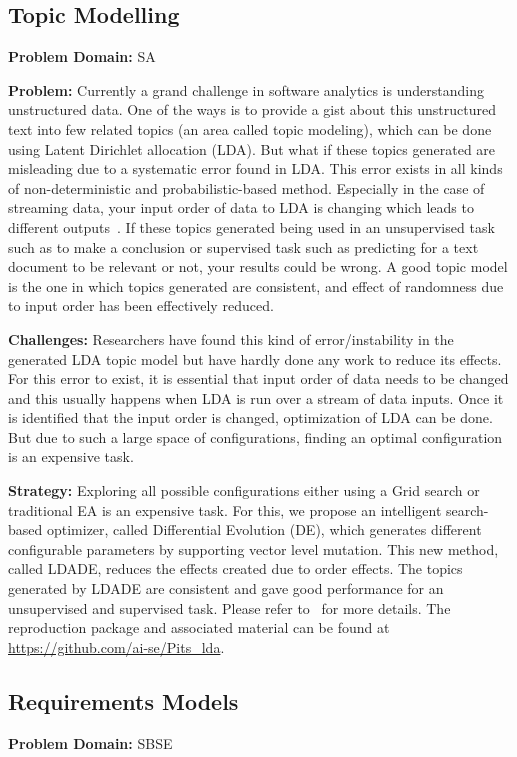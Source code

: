 \documentclass[table, xcdraw, sigconf,review, anonymous]{acmart}
\begin{document}
\subsection{Topic Modelling}
\noindent\textbf{Problem Domain: } SA

\noindent\textbf{Problem:} Currently a grand challenge in software analytics is understanding unstructured data. One of the ways is to provide a gist about this unstructured text into few related topics (an area called topic modeling), which can be done using Latent Dirichlet allocation (LDA). But what if these topics generated are misleading due to a systematic error found in LDA. This error exists in all kinds of non-deterministic and probabilistic-based method. Especially in the case of streaming data, your input order of data to LDA is changing which leads to different outputs~\cite{gennari1989models}. If these topics generated being used in an unsupervised task such as to make a conclusion or supervised task such as predicting for a text document to be relevant or not, your results could be wrong. A good topic model is the one in which topics generated are consistent, and effect of randomness due to input order has been effectively reduced.

\noindent\textbf{Challenges: } Researchers have found this kind of error/instability in the generated LDA topic model but have hardly done any work to reduce its effects. For this error to exist, it is essential that input order of data needs to be changed and this usually happens when LDA is run over a stream of data inputs. Once it is identified that the input order is changed, optimization of LDA can be done. But due to such a large space of configurations, finding an optimal configuration is an expensive task. 

\noindent\textbf{Strategy:} Exploring all possible configurations either using a Grid search or traditional EA is an expensive task. For this, we propose an intelligent search-based optimizer, called Differential Evolution (DE), which generates different configurable parameters by supporting vector level mutation. This new method, called LDADE, reduces the effects created due to order effects. The topics generated by LDADE are consistent and gave good performance for an unsupervised and supervised task. Please refer to~\cite{agrawalwrong} for more details. The reproduction package and associated material can be found at \url{https://github.com/ai-se/Pits_lda}.

 \subsection{Requirements Models}
    \textbf{Problem Domain: } SBSE
    
\end{document}

